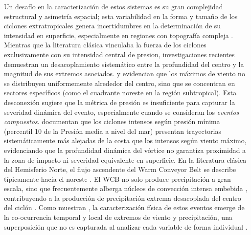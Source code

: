 Un desafío en la caracterización de estos sistemas es su gran complejidad estructural y asimetría espacial; esta variabilidad en la forma y tamaño de los ciclones extratropicales genera incertidumbres en la determinación de su intensidad en superficie, especialmente en regiones con topografía compleja \citep{neu2013intercomparison}.
%
Mientras que la literatura clásica vinculaba la fuerza de los ciclones exclusivamente con su intensidad central de presion, investigaciones recientes demuestran un desacoplamiento sistemático entre la profundidad del centro y la magnitud de sus extremos asociados. \citet{bitencourt2010relating} y \citet{cardoso2022synoptic} evidencian que los máximos de viento no se distribuyen uniformemente alrededor del centro, sino que se concentran en sectores específicos (como el cuadrante noreste en la región subtropical).
Esta desconexión sugiere que la métrica de presión es insuficiente para capturar la severidad dinámica del evento, especialmente cuando se consideran los \textit{eventos compuestos}. \citet{cardoso2022synoptic} documentan que los ciclones intensos según presión mínima (percentil 10 de la Presión media a nivel del mar) presentan trayectorias sistemáticamente más alejadas de la costa que los intensos según viento máximo, evidenciando que la profundidad dinámica del vórtice no garantiza proximidad a la zona de impacto ni severidad equivalente en superficie.
En la literatura clásica del Hemisferio Norte, el flujo ascendente del Warm Conveyor Belt se describe típicamente hacia el noreste \citep{blanchard2021warm}. El WCB no solo produce precipitación a gran escala, sino que frecuentemente alberga núcleos de convección intensa embebida \citep{oertel2021warm}, contribuyendo a la producción de precipitación extrema desacoplada del centro del ciclón \citep{naud2020evaluation}. Como muestran \citet{chen2025characteristics}, la caracterización física de estos eventos emerge de la co-ocurrencia temporal y local de extremos de viento y precipitación, una superposición que no es capturada al analizar cada variable de forma individual \citep{priestley2022improved}.

